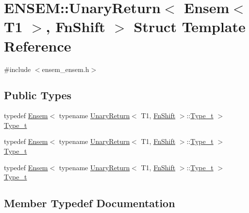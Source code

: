 \hypertarget{structENSEM_1_1UnaryReturn_3_01Ensem_3_01T1_01_4_00_01FnShift_01_4}{}\section{E\+N\+S\+EM\+:\+:Unary\+Return$<$ Ensem$<$ T1 $>$, Fn\+Shift $>$ Struct Template Reference}
\label{structENSEM_1_1UnaryReturn_3_01Ensem_3_01T1_01_4_00_01FnShift_01_4}


{\ttfamily \#include $<$ensem\+\_\+ensem.\+h$>$}

\subsection*{Public Types}
\begin{DoxyCompactItemize}
\item 
typedef \mbox{\hyperlink{classENSEM_1_1Ensem}{Ensem}}$<$ typename \mbox{\hyperlink{structENSEM_1_1UnaryReturn}{Unary\+Return}}$<$ T1, \mbox{\hyperlink{structENSEM_1_1FnShift}{Fn\+Shift}} $>$\+::\mbox{\hyperlink{structENSEM_1_1UnaryReturn_3_01Ensem_3_01T1_01_4_00_01FnShift_01_4_aed1937a9071e7b8f1a036bdb1860c54d}{Type\+\_\+t}} $>$ \mbox{\hyperlink{structENSEM_1_1UnaryReturn_3_01Ensem_3_01T1_01_4_00_01FnShift_01_4_aed1937a9071e7b8f1a036bdb1860c54d}{Type\+\_\+t}}
\item 
typedef \mbox{\hyperlink{classENSEM_1_1Ensem}{Ensem}}$<$ typename \mbox{\hyperlink{structENSEM_1_1UnaryReturn}{Unary\+Return}}$<$ T1, \mbox{\hyperlink{structENSEM_1_1FnShift}{Fn\+Shift}} $>$\+::\mbox{\hyperlink{structENSEM_1_1UnaryReturn_3_01Ensem_3_01T1_01_4_00_01FnShift_01_4_aed1937a9071e7b8f1a036bdb1860c54d}{Type\+\_\+t}} $>$ \mbox{\hyperlink{structENSEM_1_1UnaryReturn_3_01Ensem_3_01T1_01_4_00_01FnShift_01_4_aed1937a9071e7b8f1a036bdb1860c54d}{Type\+\_\+t}}
\item 
typedef \mbox{\hyperlink{classENSEM_1_1Ensem}{Ensem}}$<$ typename \mbox{\hyperlink{structENSEM_1_1UnaryReturn}{Unary\+Return}}$<$ T1, \mbox{\hyperlink{structENSEM_1_1FnShift}{Fn\+Shift}} $>$\+::\mbox{\hyperlink{structENSEM_1_1UnaryReturn_3_01Ensem_3_01T1_01_4_00_01FnShift_01_4_aed1937a9071e7b8f1a036bdb1860c54d}{Type\+\_\+t}} $>$ \mbox{\hyperlink{structENSEM_1_1UnaryReturn_3_01Ensem_3_01T1_01_4_00_01FnShift_01_4_aed1937a9071e7b8f1a036bdb1860c54d}{Type\+\_\+t}}
\end{DoxyCompactItemize}


\subsection{Member Typedef Documentation}
\mbox{\label{structENSEM_1_1UnaryReturn_3_01Ensem_3_01T1_01_4_00_01FnShift_01_4_aed1937a9071e7b8f1a036bdb1860c54d}} 
